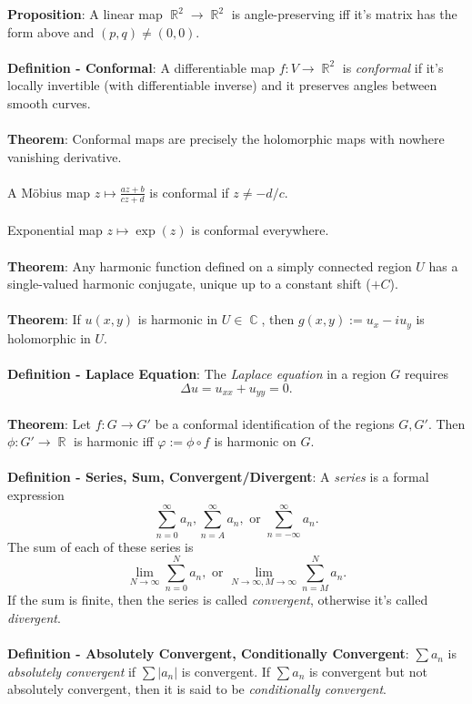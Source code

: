 \documentclass{article}
\DeclareMathOperator{\R}{\mathbb{R}}
\DeclareMathOperator{\C}{\mathbb{C}}
\begin{document}
\textbf{Proposition}: A linear map $\R^2 \rightarrow \R^2$ is angle-preserving iff it's matrix has the form above and $(p, q) \neq (0, 0)$. \\ \\
\textbf{Definition - Conformal}: A differentiable map $f: V \rightarrow \R^2$ is \textit{conformal} if it's locally invertible (with differentiable inverse) and it preserves angles between smooth curves. \\ \\
\textbf{Theorem}: Conformal maps are precisely the holomorphic maps with nowhere vanishing derivative. \\ \\
A Möbius map $z \mapsto \frac{az + b}{cz + d}$ is conformal if $z \neq -d/c$. \\ \\
Exponential map $z \mapsto \exp(z)$ is conformal everywhere. \\ \\
\textbf{Theorem}: Any harmonic function defined on a simply connected region $U$ has a single-valued harmonic conjugate, unique up to a constant shift ($+C$). \\ \\
\textbf{Theorem}: If $u(x, y)$ is harmonic in $U \in \C$, then $g(x, y) := u_x - iu_y$ is holomorphic in $U$. \\ \\
\textbf{Definition - Laplace Equation}: The \textit{Laplace equation} in a region $G$ requires $$\Delta u = u_{xx} + u_{yy} = 0.$$ \\
\textbf{Theorem}: Let $f: G \rightarrow G'$ be a conformal identification of the regions $G, G'$. Then $\phi: G' \rightarrow \R$ is harmonic iff $\varphi:= \phi \circ f$ is harmonic on $G$. \\ \\
\textbf{Definition - Series, Sum, Convergent/Divergent}: A \textit{series} is a formal expression $$\sum_{n = 0}^\infty a_n, \sum_{n = A}^\infty a_n, \text{ or } \sum_{n = -\infty}^\infty a_n.$$ The sum of each of these series is $$\lim_{N \rightarrow \infty} \sum_{n = 0}^N a_n, \text{ or } \lim_{N \rightarrow \infty, M \rightarrow \infty} \sum_{n = M}^N a_n.$$ If the sum is finite, then the series is called \textit{convergent}, otherwise it's called \textit{divergent}. \\ \\
\textbf{Definition - Absolutely Convergent, Conditionally Convergent}: $\sum a_n$ is \textit{absolutely convergent} if $\sum |a_n|$ is convergent. If $\sum a_n$ is convergent but not absolutely convergent, then it is said to be \textit{conditionally convergent}. \\ \\
\end{document}
